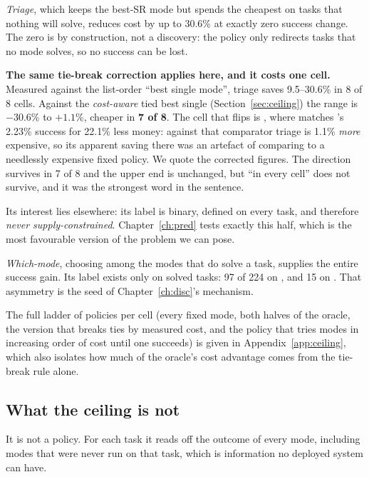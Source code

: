 \emph{Triage}, which keeps the best-SR mode but spends the cheapest on tasks that nothing will solve, reduces cost by up to 30.6\% at exactly zero success
change. The zero is by construction, not a discovery: the policy only redirects
tasks that no mode solves, so no success can be lost.

\begin{scopebox}
\textbf{The same tie-break correction applies here, and it costs one cell.}
Measured against the list-order ``best single mode'', triage saves 9.5--30.6\%
in 8 of 8 cells. Against the \emph{cost-aware} tied best single
(Section~\ref{sec:ceiling}) the range is $-30.6$\% to $+1.1$\%, cheaper in
\textbf{7 of 8}. The cell that flips is , where \mVis{}
matches \mSoM{}'s 2.23\% success for 22.1\% less money: against that comparator
triage is 1.1\% \emph{more} expensive, so its apparent saving there was an
artefact of comparing to a needlessly expensive fixed policy. We quote the
corrected figures. The direction survives in 7 of 8 and the upper end is unchanged, but ``in every cell'' does not survive, and it was the strongest
word in the sentence.
\end{scopebox}
Its interest lies elsewhere: its label is binary, defined on every task, and
therefore \emph{never supply-constrained}. Chapter~\ref{ch:pred} tests exactly
this half, which is the most favourable version of the problem we can pose.

\emph{Which-mode}, choosing among the modes that do solve a task, supplies the entire success gain. Its label exists only on solved tasks: 97 of 224 on
, and 15 on . That asymmetry is the seed
of Chapter~\ref{ch:disc}'s mechanism.

The full ladder of policies per cell (every fixed mode, both halves of the
oracle, the version that breaks ties by measured cost, and the policy that
tries modes in increasing order of cost until one succeeds) is given in
Appendix~\ref{app:ceiling}, which also isolates how much of the oracle's cost
advantage comes from the tie-break rule alone.

\subsection{What the ceiling is not}

It is not a policy. For each task it reads off the outcome of every mode,
including modes that were never run on that task, which is information no deployed
system can have.

